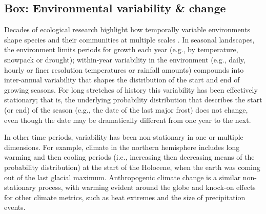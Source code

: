 \documentclass[11pt,letterpaper]{article}
\newcommand{\R}[1]{\label{}\linelabel{#1}} %
\begin{document}
\subsection{Box: Environmental variability \& change} %
Decades of ecological research highlight how temporally variable environments shape species and their communities at multiple scales \citep{Sale:1977oq,Chesson:1997dz}.  In seasonal landscapes, the environment limits periods for growth each year (e.g., by temperature, snowpack\R{r2precip3} or drought); within-year variability in the environment (e.g., daily, hourly or finer resolution temperatures or rainfall amounts) compounds into inter-annual variability that shapes the distribution of the start and end of growing seasons. For long stretches of history this variability has been effectively stationary; that is, the underlying probability distribution that describes the start (or end) of the season (e.g., the date of the last major frost) does not change, even though the date may be dramatically different from one year to the  next. %

In other time periods, variability has been non-stationary in one or multiple dimensions. For example, climate in the northern hemisphere includes long warming and then cooling periods (i.e., increasing then decreasing means of the probability distribution) at the start of the Holocene, when the earth was coming out of the last glacial maximum. Anthropogenic climate change is a similar non-stationary process, with warming evident around the globe and knock-on effects for other climate metrics, such as heat extremes and the size of precipitation events. %
\end{document}
